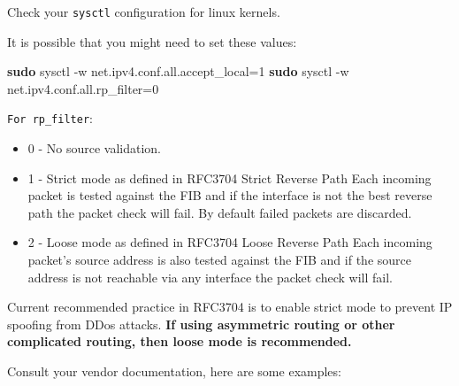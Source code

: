\documentclass[
]{article}
\newenvironment{Shaded}{\begin{snugshade}}{\end{snugshade}}
\newcommand{\AttributeTok}[1]{\textcolor[rgb]{0.13,0.29,0.53}{#1}}
\newcommand{\FunctionTok}[1]{\textcolor[rgb]{0.13,0.29,0.53}{\textbf{#1}}}
\newcommand{\NormalTok}[1]{#1}
\providecommand{\tightlist}{%
  \setlength{\itemsep}{0pt}\setlength{\parskip}{0pt}}\usepackage{longtable,booktabs,array}
\begin{document}
\begin{tcolorbox}[enhanced jigsaw, title=\textcolor{quarto-callout-important-color}{\faExclamation}\hspace{0.5em}{Important}, rightrule=.15mm, bottomtitle=1mm, opacitybacktitle=0.6, titlerule=0mm, colbacktitle=quarto-callout-important-color!10!white, coltitle=black, opacityback=0, left=2mm, toprule=.15mm, breakable, toptitle=1mm, arc=.35mm, colback=white, bottomrule=.15mm, leftrule=.75mm, colframe=quarto-callout-important-color-frame]

Check your \texttt{sysctl} configuration for linux kernels.

It is possible that you might need to set these values:

\begin{Shaded}
\begin{Highlighting}[numbers=left,,]
\FunctionTok{sudo}\NormalTok{ sysctl }\AttributeTok{{-}w}\NormalTok{ net.ipv4.conf.all.accept\_local=1}
\FunctionTok{sudo}\NormalTok{ sysctl }\AttributeTok{{-}w}\NormalTok{ net.ipv4.conf.all.rp\_filter=0}
\end{Highlighting}
\end{Shaded}

\texttt{For\ rp\_filter}:

\begin{itemize}
\tightlist
\item
  0 - No source validation.
\item
  1 - Strict mode as defined in RFC3704 Strict Reverse Path Each
  incoming packet is tested against the FIB and if the interface is not
  the best reverse path the packet check will fail. By default failed
  packets are discarded.
\item
  2 - Loose mode as defined in RFC3704 Loose Reverse Path Each incoming
  packet's source address is also tested against the FIB and if the
  source address is not reachable via any interface the packet check
  will fail.
\end{itemize}

Current recommended practice in RFC3704 is to enable strict mode to
prevent IP spoofing from DDos attacks. \textbf{If using asymmetric
routing or other complicated routing, then loose mode is recommended.}

\end{tcolorbox}

Consult your vendor documentation, here are some examples:
\end{document}
